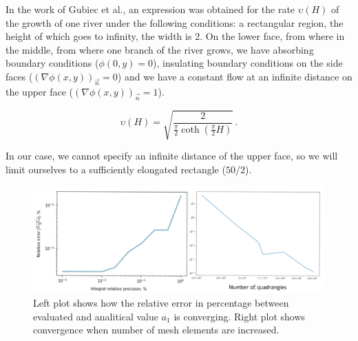 \documentclass[]{pracamgr}
\begin{document}
    In the work of Gubiec et al.\cite{gubiec2008fingered}, an expression was obtained for the rate $\upsilon(H)$ of the growth of one river under the following conditions: a rectangular region, the height of which goes to infinity, the width is $2$. On the lower face, from where in the middle, from where one branch of the river grows, we have absorbing boundary conditions ($\phi(0, y) = 0$), insulating boundary conditions on the side faces ($(\nabla \phi(x, y))_{ \vec{n}} = 0$) and we have a constant flow at an infinite distance on the upper face ($(\nabla \phi(x, y))_{\vec{n}} = 1$).

    \begin{equation}
      \label{velocity_analytical}
      \upsilon(H) = \sqrt{\frac{2}{\frac{\pi}{2}\coth(\frac{\pi}{2}H)}} \,.
    \end{equation}
    
    In our case, we cannot specify an infinite distance of the upper face, so we will limit ourselves to a sufficiently elongated rectangle ($50/2$).

    \begin{figure}[H]
      \centering
      \includegraphics[width=1\textwidth]{figs/convergence.png}        
      \caption{Left plot shows how the relative error in percentage between evaluated and analitical value $a_1$ is converging. Right plot shows convergence when number of mesh elements are increased.}
      \label{convergence_new}
    \end{figure}
\end{document}
